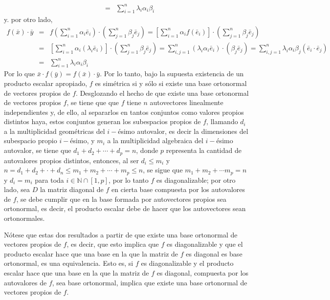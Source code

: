 \begin{solucion}
\begin{eqnarray*}
  & = & \sum_{i=1}^n \lambda_i \alpha_i \beta_i
 \end{eqnarray*}
 y. por otro lado,
 \begin{eqnarray*}
  f(\bar{x})\cdot \bar{y} & = & f\left( \sum_{i=1}^n \alpha_i \bar{e}_i \right) \cdot \left( \sum_{j=1}^n \beta_j \bar{e}_j \right) = \left[ \sum_{i=1}^n \alpha_i f(\bar{e}_i) \right] \cdot \left( \sum_{j=1}^n \beta_j \bar{e}_j \right) \\
  & = & \left[ \sum_{i=1}^n \alpha_i (\lambda_i \bar{e}_i) \right] \cdot \left( \sum_{j=1}^n \beta_j \bar{e}_j \right) = \sum_{i,j=1}^n (\lambda_i \alpha_i \bar{e}_i) \cdot (\beta_j \bar{e}_j) = \sum_{i,j=1}^n \lambda_i \alpha_i \beta_j (\bar{e}_i \cdot \bar{e}_j) \\
  & = & \sum_{i=1}^n \lambda_i \alpha_i \beta_i
 \end{eqnarray*}
 Por lo que $\bar{x}\cdot f(\bar{y}) = f(\bar{x})\cdot \bar{y}$. Por lo tanto, bajo la supuesta existencia de un producto escalar apropiado, $f$ es sim\'etrica si y s\'olo si existe una base ortonormal de vectores propios de $f$. Desglozando el hecho de que existe una base ortonormal de vectores propios $f$, se tiene que que $f$ tiene $n$ autovectores linealmente independientes y, de ello, al separarlos en tantos conjuntos como valores propios distintos haya, estos conjuntos generan los subespacios propios de $f$, llamando $d_i$ a la multiplicidad geom\'etricas del $i-$\'esimo autovalor, es decir la dimensiones del subespacio propio $i-$\'esimo, y $m_i$ a la multiplicidad algebraica del $i-$\'esimo autovalor, se tiene que $d_1+d_2+\cdots +d_p = n$, donde $p$ representa la cantidad de autovalores propios distintos, entonces, al ser $d_i\leq m_i$ y $n=d_1 + d_2 + \cdot + d_n \leq m_1 + m_2 + \cdots + m_p \leq n$, se sigue que $m_1 + m_2 + \cdots m_p = n$ y $d_i = m_i$ para toda $i\in \mathbb{N}\cap[1,p]$, por lo tanto $f$ es diagonalizable; por otro lado, sea $D$ la matriz diagonal de $f$ en cierta base compuesta por los autovalores de $f$, se debe cumplir que en la base formada por autovectores propios sea ortonormal, es decir, el producto escalar debe de hacer que los autovectores sean ortonormales.
 \par 
 N\'otese que estas dos resultados a partir de que existe una base ortonormal de vectores propios de $f$, es decir, que esto implica que $f$ es diagonalizable y que el producto escalar hace que una base en la que la matriz de $f$ es diagonal es base ortonormal, es una equivalencia. Esto es, si $f$ es diagonalizable y el producto escalar hace que una base en la que la matriz de $f$ es diagonal, compuesta por los autovalores de $f$, sea base ortonormal, implica que existe una base ortonormal de vectores propios de $f$.

\end{solucion}
